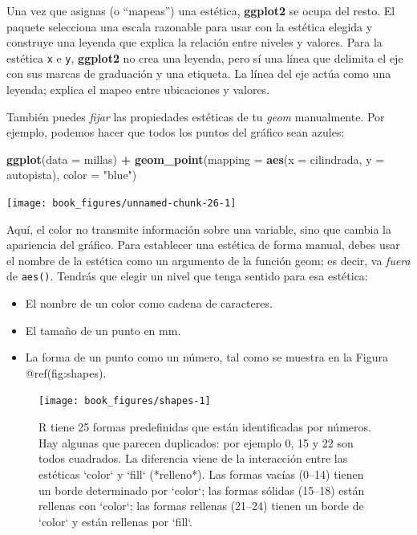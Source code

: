 \documentclass[11pt,oneside]{report}
\newenvironment{Shaded}{\begin{snugshade}}{\end{snugshade}}
\newcommand{\DataTypeTok}[1]{\textcolor[rgb]{0.13,0.29,0.53}{#1}}
\newcommand{\KeywordTok}[1]{\textcolor[rgb]{0.13,0.29,0.53}{\textbf{#1}}}
\newcommand{\NormalTok}[1]{#1}
\newcommand{\OperatorTok}[1]{\textcolor[rgb]{0.81,0.36,0.00}{\textbf{#1}}}
\newcommand{\StringTok}[1]{\textcolor[rgb]{0.31,0.60,0.02}{#1}}
\begin{document}
Una vez que asignas (o ``mapeas'') una estética, \textbf{ggplot2} se
ocupa del resto. El paquete selecciona una escala razonable para usar
con la estética elegida y construye una leyenda que explica la relación
entre niveles y valores. Para la estética \texttt{x} e \texttt{y},
\textbf{ggplot2} no crea una leyenda, pero sí una línea que delimita el
eje con sus marcas de graduación y una etiqueta. La línea del eje actúa
como una leyenda; explica el mapeo entre ubicaciones y valores.

También puedes \emph{fijar} las propiedades estéticas de tu \emph{geom}
manualmente. Por ejemplo, podemos hacer que todos los puntos del gráfico
sean azules:

\begin{Shaded}
\begin{Highlighting}[]
\KeywordTok{ggplot}\NormalTok{(}\DataTypeTok{data =}\NormalTok{ millas) }\OperatorTok{+}
\StringTok{ }\KeywordTok{geom_point}\NormalTok{(}\DataTypeTok{mapping =} \KeywordTok{aes}\NormalTok{(}\DataTypeTok{x =}\NormalTok{ cilindrada, }\DataTypeTok{y =}\NormalTok{ autopista), }\DataTypeTok{color =} \StringTok{"blue"}\NormalTok{)}
\end{Highlighting}
\end{Shaded}

\begin{center}\texttt{[image: book\_figures/unnamed-chunk-26-1]} \end{center}

Aquí, el color no transmite información sobre una variable, sino que
cambia la apariencia del gráfico. Para establecer una estética de forma
manual, debes usar el nombre de la estética como un argumento de la
función geom; es decir, va \emph{fuera} de \texttt{aes()}. Tendrás que
elegir un nivel que tenga sentido para esa estética:

\begin{itemize}
\item
  El nombre de un color como cadena de caracteres.
\item
  El tamaño de un punto en mm.
\item
  La forma de un punto como un número, tal como se muestra en la Figura
  @ref(fig:shapes).
\end{itemize}

\begin{figure}

{\centering \texttt{[image: book\_figures/shapes-1]} 

}

\caption{R tiene 25 formas predefinidas que están identificadas por números. Hay algunas que parecen duplicados: por ejemplo 0, 15 y 22 son todos cuadrados. La diferencia viene de la interacción entre las estéticas `color` y `fill` (*relleno*). Las formas vacías (0--14) tienen un borde determinado por `color`; las formas sólidas (15--18) están rellenas con `color`; las formas rellenas (21--24) tienen un borde de `color` y están rellenas por `fill`.}\label{fig:shapes}
\end{figure}
\end{document}

